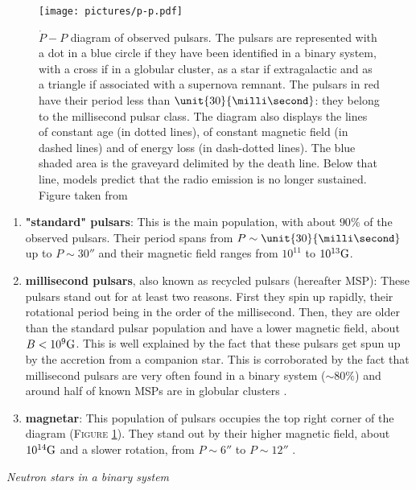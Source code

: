 \documentclass[a4paper, twoside, 12pt]{article}
\numberwithin{equation}{section}
\begin{document}
\begin{figure}[!h]
\centering
\texttt{[image: pictures/p-p.pdf]}
\caption[$\dot{P}-P$ diagram of pulsars]{$\dot{P}-P$ diagram of observed pulsars. The pulsars are represented with a dot in a blue circle if they have been identified in a binary system,  with a cross if in a globular cluster, as a star if extragalactic and as a triangle if associated with a supernova remnant. The pulsars in red  have their period less than $\unit{30}{\milli\second} $: they belong to the millisecond pulsar class. The diagram also displays the lines of constant age (in dotted lines), of constant magnetic field (in dashed lines) and of energy loss (in dash-dotted lines). The blue shaded area is the graveyard delimited by the death line. Below that line, models predict that the radio emission is no longer sustained. Figure taken from \cite{diagP-P}}
\label{fig: diagPP}
\end{figure}
\begin{enumerate}[label=\roman*)]
\item \textbf{"standard" pulsars}: This is the main population, with about $90 \%$ of the observed pulsars. Their period spans from $P \sim \unit{30}{\milli\second} $ up to $P \sim \unit{30}{\second}  $ and their magnetic field ranges from $10^{11} $ to $ 10^{13} \rm{G}$.
\item \textbf{millisecond pulsars}, also known as recycled pulsars (hereafter MSP): These pulsars stand out for at least two reasons. First they spin up rapidly, their rotational period being in the order of the millisecond. Then, they are older than the standard pulsar population and have a lower magnetic field, about $ B < 10^{9} \rm{G}$. This is well explained by the fact that these pulsars get spun up by the accretion from a companion star. This is corroborated by the fact that millisecond pulsars are very often found in a binary system ($\sim 80 \%$)  and around half of known MSPs are in globular clusters \cite{Lorimer+2008} .
\item \textbf{magnetar}: This population of pulsars occupies the top right corner of the diagram (F\textsc{igure} \ref{fig: diagPP}). They stand out by their higher magnetic field, about $10^{14} \rm{G}$ and a slower rotation, from $P \sim \unit{6}{\second}$ to $P \sim \unit{12}{\second}$ \cite{magnetar}.
\end{enumerate}

{\itshape{Neutron stars in a binary system}} \\
\end{document}
